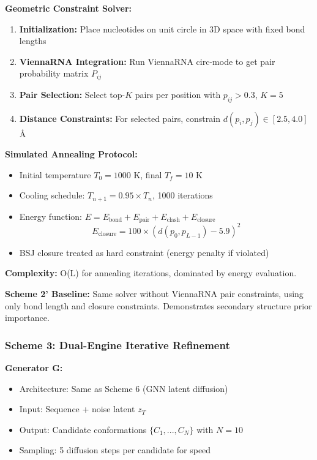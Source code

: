 \documentclass[12pt]{article}
\begin{document}
\textbf{Geometric Constraint Solver:}
\begin{enumerate}
\item \textbf{Initialization:} Place nucleotides on unit circle in 3D space with fixed bond lengths
\item \textbf{ViennaRNA Integration:} Run ViennaRNA circ-mode to get pair probability matrix $P_{ij}$
\item \textbf{Pair Selection:} Select top-$K$ pairs per position with $p_{ij} > 0.3$, $K=5$
\item \textbf{Distance Constraints:} For selected pairs, constrain $d(p_i, p_j) \in [2.5, 4.0]$Å
\end{enumerate}

\textbf{Simulated Annealing Protocol:}
\begin{itemize}
\item Initial temperature $T_0 = 1000$ K, final $T_f = 10$ K
\item Cooling schedule: $T_{n+1} = 0.95 \times T_n$, 1000 iterations
\item Energy function: $E = E_{\text{bond}} + E_{\text{pair}} + E_{\text{clash}} + E_{\text{closure}}$
\begin{equation}
E_{\text{closure}} = 100 \times (d(p_0, p_{L-1}) - 5.9)^2
\end{equation}
\item BSJ closure treated as hard constraint (energy penalty if violated)
\end{itemize}

\textbf{Complexity:} O(L) for annealing iterations, dominated by energy evaluation.

\textbf{Scheme 2' Baseline:} Same solver without ViennaRNA pair constraints, using only bond length and closure constraints. Demonstrates secondary structure prior importance.

\subsubsection{Scheme 3: Dual-Engine Iterative Refinement}

\textbf{Generator G:}
\begin{itemize}
\item Architecture: Same as Scheme 6 (GNN latent diffusion)
\item Input: Sequence + noise latent $z_T$
\item Output: Candidate conformations $\{C_1, ..., C_N\}$ with $N=10$
\item Sampling: 5 diffusion steps per candidate for speed
\end{itemize}
\end{document}

